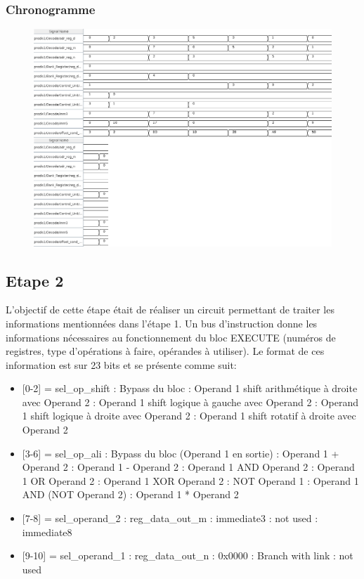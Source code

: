 \documentclass[a4paper]{article} %
\begin{document}
\subsubsection{Chronogramme}
\begin{figure}[H]
    \centering
    \includegraphics[width=1\textwidth]{src/CHRONO_ETAPE1.png}
    \label{fig:Chronogramme}
\end{figure}

\subsection{Etape 2}
L'objectif de cette étape était de réaliser un circuit permettant de traiter les informations mentionnées dans l'étape 1.
Un bus d'instruction donne les informations nécessaires au fonctionnement du bloc EXECUTE (numéros de registres, type d'opérations à faire, opérandes à utiliser). Le format de ces information est sur 23 bits et se présente comme suit: \medskip \\
\begin{itemize}
\item{[0-2] = sel\_op\_shift}
    : Bypass du bloc
    : Operand 1 shift arithmétique à droite avec Operand 2
    : Operand 1 shift logique à gauche avec Operand 2
    : Operand 1 shift logique à droite avec Operand 2
    : Operand 1 shift rotatif à droite avec Operand 2
\item{[3-6] = sel\_op\_ali}
    : Bypass du bloc (Operand 1 en sortie)
    : Operand 1 + Operand 2
    : Operand 1 - Operand 2
    : Operand 1 AND Operand 2
    : Operand 1 OR Operand 2
    : Operand 1 XOR Operand 2
    : NOT Operand 1
    : Operand 1 AND (NOT Operand 2)
    : Operand 1 * Operand 2
\item{[7-8] = sel\_operand\_2}
    : reg\_data\_out\_m
    : immediate3
    : not used
    : immediate8
\item{[9-10] = sel\_operand\_1}
    : reg\_data\_out\_n
    : 0x0000
    : Branch with link
    : not used
\end{itemize}
\end{document}
